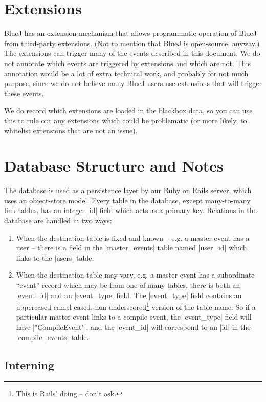 \documentclass{report}
\begin{document}
\section{Extensions}

BlueJ has an extension mechanism that allows programmatic operation of BlueJ
from third-party extensions.  (Not to mention that BlueJ is open-source,
anyway.)  The extensions can trigger many of the events described in this
document.  We do not annotate which events are triggered by extensions and
which are not.  This annotation would be a lot of extra technical work, and
probably for not much purpose, since we do not believe many BlueJ users use
extensions that will trigger these events.

We do record which extensions are loaded in the blackbox data, so you can use
this to rule out any extensions which could be problematic (or more likely, to
whitelist extensions that are not an issue).


\section{Database Structure and Notes}
\label{sec:assoc}

The database is used as a persistence layer by our Ruby on Rails server, which
uses an object-store model.  Every table in the database, except many-to-many link tables, has an
integer |id| field which acts as a primary key.  Relations in the database are
handled in two ways:

\begin{enumerate}
\item When the destination table is fixed and known -- e.g. a master event has a user --
  there is a field in the |master_events| table named |user_id| which links to
  the |users| table.
\item When the destination table may vary, e.g. a master event has a subordinate
  ``event'' record which may be from one of many tables, there is both an
  |event_id| and an |event_type| field.  The |event_type| field contains an
  uppercased camel-cased, non-underscored\footnote{This is Rails' doing -- don't ask.} version
  of the table name.  So if a particular master event links to a compile
  event, the |event_type| field will have |"CompileEvent"|, and the |event_id|
  will correspond to an |id| in the |compile_events| table.
\end{enumerate}

\subsection{Interning}
\label{def:intern}
\end{document}
